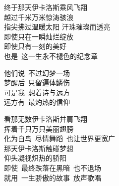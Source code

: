 \documentclass[twoside,12pt]{book}
\begin{document}
\begin{center}
\begin{multicols}{2}
\vspace{1em}
终于那天伊卡洛斯乘风飞翔\\
越过千米万米惊涛骇浪\\
指尖拂过温暖太阳 汗珠璀璨而透亮\\
即使只在一瞬灿烂绽放\\
即使只有一刻的美好\\
也是~这一生永不褪色的纪念章

\vspace{1em}
他们说~不过幻梦一场\\
梦醒后~只留遍体鳞伤\\
可是我~想着诗与远方\\
远方有~最灼热的信仰

\vspace{1em}
看那无数伊卡洛斯并肩飞翔\\
挥着千只万只美丽翅膀\\
化为白鸟~尽情舞蹈~也让世界更宽广\\
那天伊卡洛斯触碰梦想\\
仰头凝视炽热的骄阳\\
即使~最终跌落在黑暗~也不退场\\
就用~一生骄傲的故事~放声歌唱
\end{multicols}
\end{center} 
\end{document}
